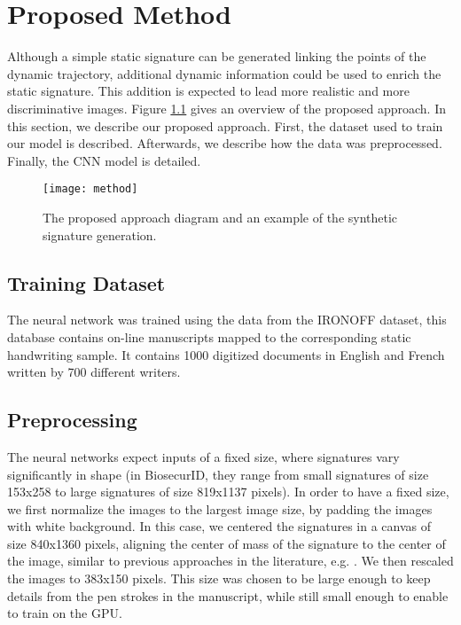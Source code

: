
\chapter{Proposed Method}\label{ch:method}




Although a simple static signature can be generated linking the points of the dynamic trajectory, additional dynamic information could be used to enrich the static signature. This addition is expected to lead more realistic and more discriminative images. Figure \ref{fig_approach} gives an overview of the proposed approach. In this section, we describe our proposed approach. First, the dataset used to train our model is described. Afterwards, we describe how the data was preprocessed. Finally, the CNN model is detailed. 

\begin{figure}[!htb]
\centering
\texttt{[image: method]}
\caption{The proposed approach diagram and an example of the synthetic signature generation.}
\label{fig_approach}
\end{figure}

\section{Training Dataset}
The neural network was trained using the data from the IRONOFF \cite{viard1999ireste} dataset, this database contains on-line manuscripts mapped to the corresponding static handwriting sample. It contains 1000 digitized documents in English and French written by 700 different writers.

\section{Preprocessing}
The neural networks expect inputs of a fixed size, where signatures vary significantly in
shape (in BiosecurID, they range from small signatures of size 153x258 to large signatures of size 819x1137 pixels). In order to have a fixed size, we first normalize the images to the largest image size, by padding the images with
white background. In this case, we centered the signatures in
a canvas of size 840x1360 pixels, aligning the center of mass
of the signature to the center of the image, similar to previous
approaches in the literature, e.g. \cite{pourshahabi2009offline}. We then rescaled the
images to 383x150 pixels. This size was chosen to be large enough to keep
details from the pen strokes in the manuscript, while still small
enough to enable to train on the GPU.

